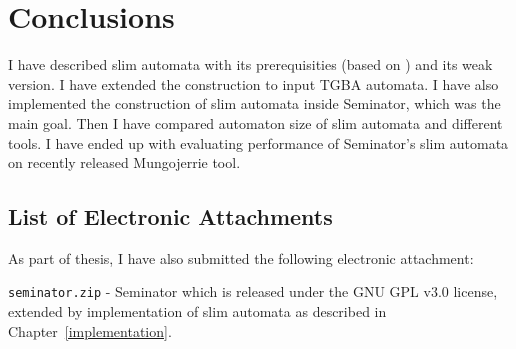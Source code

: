 \documentclass[
	digital,
nolof, nolot
]{fithesis3}
\begin{document}
	\chapter{Conclusions}
	
	I have described slim automata with its prerequisities (based on \cite{hlavni}) and its weak version.
	I have extended the construction to input TGBA automata.
	I have also implemented the construction of slim automata inside Seminator, which was the main goal.
	Then I have compared automaton size of slim automata and different tools.
	I have ended up with evaluating performance of Seminator's slim automata on recently released Mungojerrie tool.
	
	\begin{appendices}
	
	\chapter{List of Electronic Attachments}
	As part of thesis, I have also submitted the following electronic attachment:
	
	\texttt{seminator.zip} - Seminator which is released under the GNU GPL v3.0 license, extended by implementation of slim automata as described in Chapter~\ref{implementation}.
	\end{appendices}
\end{document}

